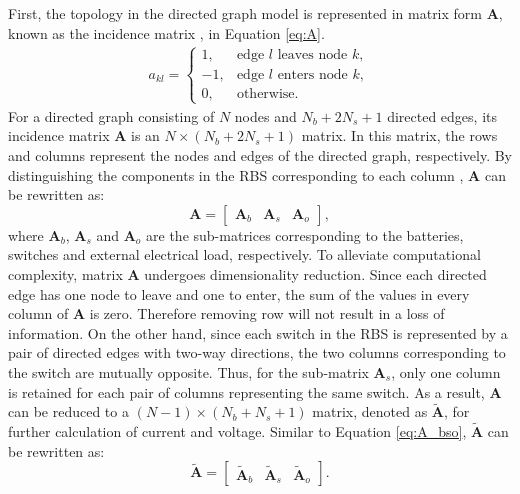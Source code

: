 \documentclass{article}
\begin{document}
First, the topology in the directed graph model is represented in matrix form $\bm{A}$, known as the incidence matrix ,  in Equation \ref{eq:A}.
\begin{align}\label{eq:A}
    a_{kl}=
    \begin{cases}
        1,  & \text{edge $l$ leaves node $k$},\\
        -1, & \text{edge $l$ enters node $k$},\\
        0,  & \text{otherwise}.
    \end{cases}
\end{align}
For a directed graph consisting of $N$ nodes and $N_b+2N_s+1$ directed edges, its incidence matrix $\bm{A}$ is an $N\times(N_b+2N_s+1)$ matrix. 
In this matrix, the rows and columns represent the nodes and edges of the directed graph, respectively.
By distinguishing the components in the RBS corresponding to each column , $\bm{A}$ can be rewritten as:
\begin{equation}\label{eq:A_bso}
    \bm{A} =
    \begin{bmatrix}
        \bm{A}_b & \bm{A}_s & \bm{A}_o
    \end{bmatrix},
\end{equation}
where $\bm{A}_b$, $\bm{A}_s$ and $\bm{A}_o$ are the sub-matrices corresponding to the batteries, switches and external electrical load, respectively.
To alleviate computational complexity, matrix $\bm{A}$ undergoes dimensionality reduction.
Since each directed edge has one node to leave and one to enter, the sum of the values in every column of $\bm{A}$ is zero.
Therefore removing  row will not result in a loss of information. 
On the other hand, since each switch in the RBS is represented by a pair of directed edges with two-way directions, the two columns corresponding to the switch are mutually opposite.
Thus, for the sub-matrix $\bm{A}_s$, only one column is retained for each pair of columns representing the same switch.
As a result, $\bm{A}$ can be reduced to a $(N-1)\times(N_b+N_s+1)$ matrix, denoted as $\bm{\tilde{A}}$, for further calculation of current and voltage.
Similar to Equation \ref{eq:A_bso}, $\bm{\tilde{A}}$ can be rewritten as:
\begin{equation}\label{eq:A_bso_tilde}
    \bm{\tilde{A}} =
    \begin{bmatrix}
        \bm{\tilde{A}}_b & \bm{\tilde{A}}_s & \bm{\tilde{A}}_o
    \end{bmatrix}.
\end{equation}
\end{document}
